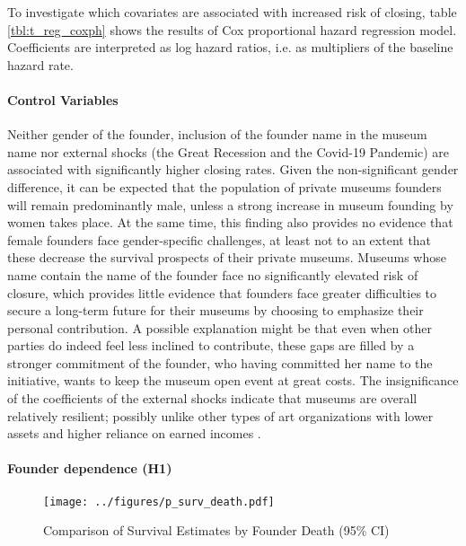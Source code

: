 \documentclass[12pt]{article}
\begin{document}
To investigate which covariates are associated with increased risk of closing, table \ref{tbl:t_reg_coxph} shows the results of Cox proportional hazard regression model.
Coefficients are interpreted as log hazard ratios, i.e. as multipliers of the baseline hazard rate.
\paragraph*{Control Variables}


Neither gender of the founder, inclusion of the founder name in the museum name nor external shocks (the Great Recession and the Covid-19 Pandemic) are associated with significantly higher closing rates.
Given the non-significant gender difference, it can be expected that the population of private museums founders will remain predominantly male, unless a strong increase in museum founding by women takes place.
At the same time, this finding also provides no evidence that female founders face gender-specific challenges, at least not to an extent that these decrease the survival prospects of their private museums.
Museums whose name contain the name of the founder face no significantly elevated risk of closure, which provides little evidence that founders face greater difficulties to secure a long-term future for their museums by choosing to emphasize their personal contribution.
A possible explanation might be that even when other parties do indeed feel less inclined to contribute, these gaps are filled by a stronger commitment of the founder, who having committed her name to the initiative, wants to keep the museum open event at great costs.
The insignificance of the coefficients of the external shocks indicate that museums are overall relatively resilient; possibly unlike other types of art organizations with lower assets and higher reliance on earned incomes \parencite[p.102]{Bowen_etal_1994_charitable}.  
\paragraph*{Founder dependence (H1)}





\begin{figure}[htbp]
\centering
\texttt{[image: ../figures/p\_surv\_death.pdf]}
\caption{\label{fig:p_surv_death}Comparison of Survival Estimates by Founder Death (95\% CI)}
\end{figure}
\end{document}
